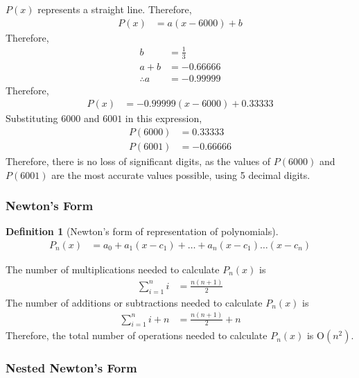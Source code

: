 \documentclass[fleqn, a4paper, 12pt, twoside]{article}
\theoremstyle{definition}
\newtheorem{definition}{Definition}
\theoremstyle{theorem}
\begin{document}
\begin{solution}
	$P(x)$ represents a straight line.
	Therefore,
	\begin{align*}
		P(x) &= a (x - 6000) + b
	\end{align*}
	Therefore,
	\begin{align*}
		b &= \frac{1}{3}\\
		a + b &= -0.66666\\
		\therefore a &= -0.99999
	\end{align*}
	Therefore,
	\begin{align*}
		P(x) &= -0.99999 (x - 6000) + 0.33333
	\end{align*}
	Substituting $6000$ and $6001$ in this expression,
	\begin{align*}
		P(6000) &= 0.33333\\
		P(6001) &= -0.66666
	\end{align*}
	Therefore, there is no loss of significant digits, as the values of $P(6000)$ and $P(6001)$ are the most accurate values possible, using 5 decimal digits.
\end{solution}

\subsubsection{Newton's Form}

\begin{definition}[Newton's form of representation of polynomials]
	\begin{align*}
		P_n(x) &= a_0 + a_1 (x - c_1) + \dots + a_n (x - c_1) \dots (x - c_n)
	\end{align*}
\end{definition}

The number of multiplications needed to calculate $P_n(x)$ is 
\begin{align*}
	\sum\limits_{i = 1}^{n} i &= \frac{n (n + 1)}{2}
\end{align*}
The number of additions or subtractions needed to calculate $P_n(x)$ is 
\begin{align*}
	\sum\limits_{i = 1}^{n} i + n &= \frac{n (n + 1)}{2} + n
\end{align*}
Therefore, the total number of operations needed to calculate $P_n(x)$ is $\mathrm{O}(n^2)$.

\subsubsection{Nested Newton's Form}
\end{document}
